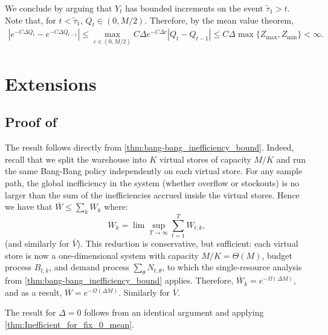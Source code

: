 \documentclass[mnsc,nonblindrev]{informs3}
\newcommand{\ALG}{{Bang-Bang}\xspace}
\newcommand{\Ttaulow}{\widetilde{\tau}_1}
\renewenvironment{proof}[1][Proof]{%
  \par\noindent{\itshape #1.} \ignorespaces
}{%
  \hfill\Halmos\par
}
\begin{document}
\begin{APPENDICES}
\begin{proof}
    We conclude by arguing that $Y_t$ has bounded increments on the event $\Ttaulow > t$. Note that, for $t < \Ttaulow$, $Q_t \in (0,M/2)$. Therefore, by the mean value theorem,
    \begin{align*}
    |e^{-C\Delta Q_t}-e^{-C\Delta Q_{t-1}}| \leq \max_{c\in (0,M/2)} C\Delta e^{-C\Delta c}  |Q_t-Q_{t-1}| \leq C\Delta\max\{Z_{\max},Z_{\min}\} < \infty.
    \end{align*}
\end{proof}





\section{Extensions}
\label{app:extensions}

\subsection{Proof of }\label{apx:extensions-proof}

\ExtensionThm*
\begin{proof}
The result follows directly from \cref{thm:bang-bang_inefficiency_bound}.  Indeed, recall that we split the warehouse into $K$ virtual stores of capacity $M/K$ and run the same \ALG policy independently on each virtual store. For any sample path, the global inefficiency in the system (whether overflow or stockouts) is no larger than the sum of the inefficiencies accrued inside the virtual stores. Hence we have that $\overline{W} \leq \sum_k \overline{W}_k$ where:
\[
\overline{W}_k = \lim \sup_{T \rightarrow \infty} \sum_{t=1}^T W_{t,k},
\]
(and similarly for $\overline{V}$).  {This reduction is conservative, but sufficient: each virtual store is now a one-dimensional system with capacity $M / K = \Theta(M)$, budget process $B_{t,k}$, and demand process $\sum_\theta N_{t,\theta}$, to which the single-resource analysis from \cref{thm:bang-bang_inefficiency_bound} applies.}  Therefore, $\overline{W}_k = e^{-\Omega(\Delta M)}$, and as a result, $\overline{W} = e^{- \Omega(\Delta M)}$. Similarly for $\overline{V}$.

The result for $\Delta = 0$ follows from an identical argument and applying \cref{thm:Inefficient_for_fix_0_mean}.
\end{proof}


\end{APPENDICES}
\end{document}
